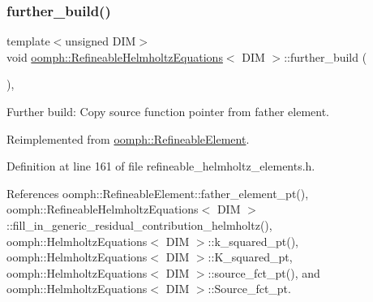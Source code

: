 \subsubsection{\texorpdfstring{further\+\_\+build()}{further\_build()}}
{\footnotesize\ttfamily template$<$unsigned D\+IM$>$ \\
void \hyperlink{classoomph_1_1RefineableHelmholtzEquations}{oomph\+::\+Refineable\+Helmholtz\+Equations}$<$ D\+IM $>$\+::further\+\_\+build (\begin{DoxyParamCaption}{ }\end{DoxyParamCaption})\hspace{0.3cm}{\ttfamily [inline]}, {\ttfamily [virtual]}}



Further build\+: Copy source function pointer from father element. 



Reimplemented from \hyperlink{classoomph_1_1RefineableElement_a26628ce36dfad028686adeb4694a9ef3}{oomph\+::\+Refineable\+Element}.



Definition at line 161 of file refineable\+\_\+helmholtz\+\_\+elements.\+h.



References oomph\+::\+Refineable\+Element\+::father\+\_\+element\+\_\+pt(), oomph\+::\+Refineable\+Helmholtz\+Equations$<$ D\+I\+M $>$\+::fill\+\_\+in\+\_\+generic\+\_\+residual\+\_\+contribution\+\_\+helmholtz(), oomph\+::\+Helmholtz\+Equations$<$ D\+I\+M $>$\+::k\+\_\+squared\+\_\+pt(), oomph\+::\+Helmholtz\+Equations$<$ D\+I\+M $>$\+::\+K\+\_\+squared\+\_\+pt, oomph\+::\+Helmholtz\+Equations$<$ D\+I\+M $>$\+::source\+\_\+fct\+\_\+pt(), and oomph\+::\+Helmholtz\+Equations$<$ D\+I\+M $>$\+::\+Source\+\_\+fct\+\_\+pt.

\mbox{\label{classoomph_1_1RefineableHelmholtzEquations_a6d3102c899dac5c4e18fee3564323509}} 
